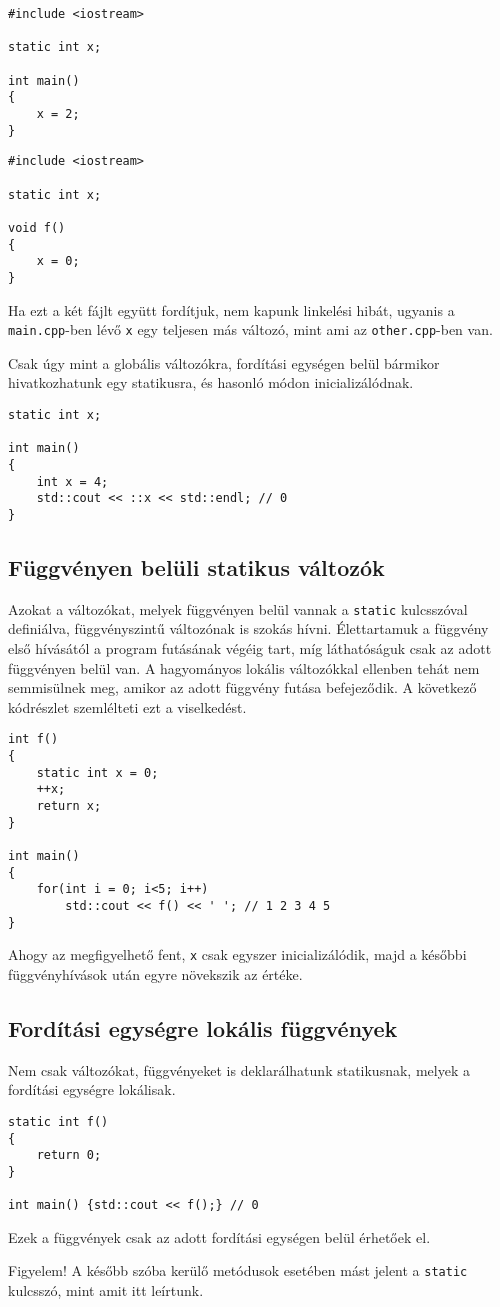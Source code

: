 \documentclass[a4paper,11.5pt,table]{article}
\begin{document}
	\begin{lstlisting}
#include <iostream>

static int x;

int main()
{
	x = 2;
}
	\end{lstlisting}
	\medskip
	
	\begin{lstlisting}
#include <iostream>

static int x;

void f()
{
	x = 0;
}
	\end{lstlisting}
	Ha ezt a két fájlt együtt fordítjuk, nem kapunk linkelési hibát, ugyanis a \texttt{main.cpp}-ben lévő \texttt{x} egy teljesen más változó, mint ami az \texttt{other.cpp}-ben van.
	
	\smallskip
	Csak úgy mint a globális változókra, fordítási egységen belül bármikor hivatkozhatunk egy statikusra, és hasonló módon inicializálódnak.
	\begin{lstlisting}
static int x;

int main()
{
	int x = 4;
	std::cout << ::x << std::endl; // 0
}
	\end{lstlisting}
	\subsection{Függvényen belüli statikus változók}
	Azokat a változókat, melyek függvényen belül vannak a \texttt{static} kulcsszóval definiálva, függvényszintű változónak is szokás hívni. Élettartamuk a függvény első hívásától a program futásának végéig tart, míg láthatóságuk csak az adott függvényen belül van. A hagyományos lokális változókkal ellenben tehát nem semmisülnek meg, amikor az adott függvény futása befejeződik. A következő kódrészlet szemlélteti ezt a viselkedést.
	
	\begin{lstlisting}
int f()
{
	static int x = 0;
	++x;
	return x;
}

int main() 
{
	for(int i = 0; i<5; i++)
		std::cout << f() << ' '; // 1 2 3 4 5
}
	\end{lstlisting}
	Ahogy az megfigyelhető fent, \texttt{x} csak egyszer inicializálódik, majd a későbbi függvényhívások után egyre növekszik az értéke.
	\subsection{Fordítási egységre lokális függvények}
  Nem csak változókat, függvényeket is deklarálhatunk statikusnak, melyek a fordítási egységre lokálisak. 
	\begin{lstlisting}
static int f()
{
	return 0;
}

int main() {std::cout << f();} // 0
	\end{lstlisting}
	Ezek a függvények csak az adott fordítási egységen belül érhetőek el.
	\begin{note}
		Figyelem! A később szóba kerülő metódusok esetében mást jelent a \texttt{static} kulcsszó, mint amit itt leírtunk.
	\end{note}
\end{document}
